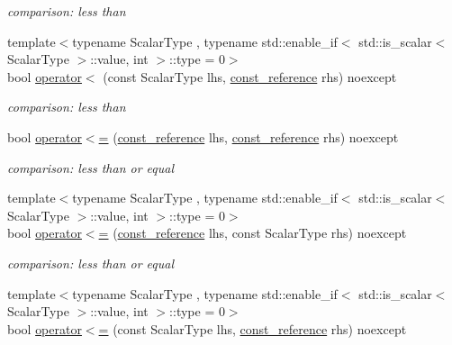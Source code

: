 \begin{DoxyCompactItemize}
\begin{DoxyCompactList}\small\item\em comparison\+: less than \end{DoxyCompactList}\item 
{\footnotesize template$<$typename Scalar\+Type , typename std\+::enable\+\_\+if$<$ std\+::is\+\_\+scalar$<$ Scalar\+Type $>$\+::value, int $>$\+::type  = 0$>$ }\\bool \mbox{\hyperlink{classnlohmann_1_1basic__json_abed3e9b4ab75f5bcbd3cd20f5af5cdab}{operator$<$}} (const Scalar\+Type lhs, \mbox{\hyperlink{classnlohmann_1_1basic__json_a4057c5425f4faacfe39a8046871786ca}{const\+\_\+reference}} rhs) noexcept
\begin{DoxyCompactList}\small\item\em comparison\+: less than \end{DoxyCompactList}\item 
bool \mbox{\hyperlink{classnlohmann_1_1basic__json_a5c8bb5200f5eac10d31e26be46e5b1ac}{operator$<$=}} (\mbox{\hyperlink{classnlohmann_1_1basic__json_a4057c5425f4faacfe39a8046871786ca}{const\+\_\+reference}} lhs, \mbox{\hyperlink{classnlohmann_1_1basic__json_a4057c5425f4faacfe39a8046871786ca}{const\+\_\+reference}} rhs) noexcept
\begin{DoxyCompactList}\small\item\em comparison\+: less than or equal \end{DoxyCompactList}\item 
{\footnotesize template$<$typename Scalar\+Type , typename std\+::enable\+\_\+if$<$ std\+::is\+\_\+scalar$<$ Scalar\+Type $>$\+::value, int $>$\+::type  = 0$>$ }\\bool \mbox{\hyperlink{classnlohmann_1_1basic__json_a7e368211047f725f333696aefdf39ffd}{operator$<$=}} (\mbox{\hyperlink{classnlohmann_1_1basic__json_a4057c5425f4faacfe39a8046871786ca}{const\+\_\+reference}} lhs, const Scalar\+Type rhs) noexcept
\begin{DoxyCompactList}\small\item\em comparison\+: less than or equal \end{DoxyCompactList}\item 
{\footnotesize template$<$typename Scalar\+Type , typename std\+::enable\+\_\+if$<$ std\+::is\+\_\+scalar$<$ Scalar\+Type $>$\+::value, int $>$\+::type  = 0$>$ }\\bool \mbox{\hyperlink{classnlohmann_1_1basic__json_ad73f88f70fe5acfa521750a8cd710026}{operator$<$=}} (const Scalar\+Type lhs, \mbox{\hyperlink{classnlohmann_1_1basic__json_a4057c5425f4faacfe39a8046871786ca}{const\+\_\+reference}} rhs) noexcept

\end{DoxyCompactItemize}
